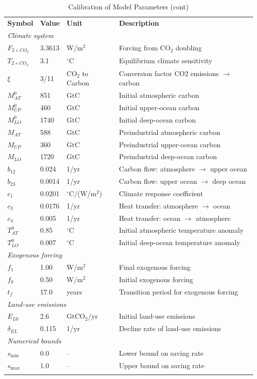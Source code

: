 \documentclass[11pt]{scrartcl}%
\theoremstyle{mytheoremstyle}
\theoremstyle{plain}
\begin{document}
\begin{table}[h]
\caption{Calibration of Model Parameters (cont)}%
\label{tab:calibration}%
\centering
\begin{tabular}
[c]{lllp{8cm}}%
\toprule \textbf{Symbol} & \textbf{Value} & \textbf{Unit} &
\textbf{Description}\\
\multicolumn{4}{l}{\textit{Climate system}}\\
$F_{2\times CO_{2}}$ & 3.3613 & W/m$^{2}$ & Forcing from CO$_{2}$ doubling\\
$T_{2\times CO_{2}}$ & 3.1 & $^{\circ}$C & Equilibrium climate sensitivity\\
$\xi$ & 3/11 & CO$_2$ to Carbon & Conversion factor CO2 emissions $\to$ carbon\\
$M_{AT}^{0}$ & 851 & GtC & Initial atmospheric carbon\\
$M_{UP}^{0}$ & 460 & GtC & Initial upper-ocean carbon\\
$M_{LO}^{0}$ & 1740 & GtC & Initial deep-ocean carbon\\
$M_{AT}$ & 588 & GtC & Preindustrial atmospheric carbon\\
$M_{UP}$ & 360 & GtC & Preindustrial upper-ocean carbon\\
$M_{LO}$ & 1720 & GtC & Preindustrial deep-ocean carbon\\
$b_{12}$ & 0.024 & 1/yr & Carbon flow: atmosphere $\to$ upper ocean\\
$b_{23}$ & 0.0014 & 1/yr & Carbon flow: upper ocean $\to$ deep ocean\\
$c_{1}$ & 0.0201 & $^{\circ}$C/(W/m$^{2}$) & Climate response coefficient\\
$c_{3}$ & 0.0176 & 1/yr & Heat transfer: atmosphere $\to$ ocean\\
$c_{4}$ & 0.005 & 1/yr & Heat transfer: ocean $\to$ atmosphere\\
$T_{AT}^{0}$ & 0.85 & $^{\circ}$C & Initial atmospheric temperature anomaly\\
$T_{LO}^{0}$ & 0.007 & $^{\circ}$C & Initial deep-ocean temperature anomaly\\
\multicolumn{4}{l}{\textit{Exogenous forcing}}\\
$f_{1}$ & 1.00 & W/m$^{2}$ & Final exogenous forcing\\
$f_{0}$ & 0.50 & W/m$^{2}$ & Initial exogenous forcing\\
$t_{f}$ & 17.0 & years & Transition period for exogenous forcing\\
\multicolumn{4}{l}{\textit{Land-use emissions}}\\
$E_{L0}$ & 2.6 & GtCO$_{2}$/yr & Initial land-use emissions\\
$\delta_{EL}$ & 0.115 & 1/yr & Decline rate of land-use emissions\\
\multicolumn{4}{l}{\textit{Numerical bounds}}\\
$s_{\min}$ & 0.0 & -- & Lower bound on saving rate\\
$s_{\max}$ & 1.0 & -- & Upper bound on saving rate\\
\bottomrule &  &  &
\end{tabular}
\end{table}
\end{document}
